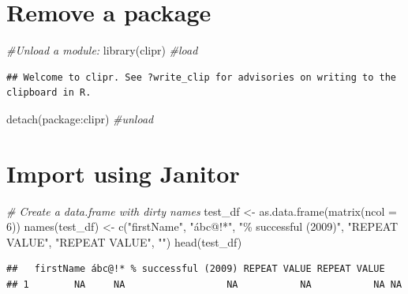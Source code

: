 \documentclass[
]{book}
\newenvironment{Shaded}{\begin{snugshade}}{\end{snugshade}}
\newcommand{\AttributeTok}[1]{\textcolor[rgb]{0.77,0.63,0.00}{#1}}
\newcommand{\CommentTok}[1]{\textcolor[rgb]{0.56,0.35,0.01}{\textit{#1}}}
\newcommand{\DecValTok}[1]{\textcolor[rgb]{0.00,0.00,0.81}{#1}}
\newcommand{\FunctionTok}[1]{\textcolor[rgb]{0.00,0.00,0.00}{#1}}
\newcommand{\NormalTok}[1]{#1}
\newcommand{\OtherTok}[1]{\textcolor[rgb]{0.56,0.35,0.01}{#1}}
\newcommand{\SpecialCharTok}[1]{\textcolor[rgb]{0.00,0.00,0.00}{#1}}
\newcommand{\StringTok}[1]{\textcolor[rgb]{0.31,0.60,0.02}{#1}}
\begin{document}
\hypertarget{remove-a-package}{%
\section{Remove a package}\label{remove-a-package}}

\begin{Shaded}
\begin{Highlighting}[]
\CommentTok{\#Unload a module: }
\FunctionTok{library}\NormalTok{(clipr) }\CommentTok{\#load}
\end{Highlighting}
\end{Shaded}

\begin{verbatim}
## Welcome to clipr. See ?write_clip for advisories on writing to the clipboard in R.
\end{verbatim}

\begin{Shaded}
\begin{Highlighting}[]
\FunctionTok{detach}\NormalTok{(package}\SpecialCharTok{:}\NormalTok{clipr) }\CommentTok{\#unload}
\end{Highlighting}
\end{Shaded}

\hypertarget{import-using-janitor}{%
\section{Import using Janitor}\label{import-using-janitor}}

\begin{Shaded}
\begin{Highlighting}[]
\CommentTok{\# Create a data.frame with dirty names}
\NormalTok{test\_df }\OtherTok{\textless{}{-}} \FunctionTok{as.data.frame}\NormalTok{(}\FunctionTok{matrix}\NormalTok{(}\AttributeTok{ncol =} \DecValTok{6}\NormalTok{))}
\FunctionTok{names}\NormalTok{(test\_df) }\OtherTok{\textless{}{-}} \FunctionTok{c}\NormalTok{(}\StringTok{"firstName"}\NormalTok{, }\StringTok{"ábc@!*"}\NormalTok{, }\StringTok{"\% successful (2009)"}\NormalTok{,}
                    \StringTok{"REPEAT VALUE"}\NormalTok{, }\StringTok{"REPEAT VALUE"}\NormalTok{, }\StringTok{""}\NormalTok{)}
\FunctionTok{head}\NormalTok{(test\_df)}
\end{Highlighting}
\end{Shaded}

\begin{verbatim}
##   firstName ábc@!* % successful (2009) REPEAT VALUE REPEAT VALUE   
## 1        NA     NA                  NA           NA           NA NA
\end{verbatim}
\end{document}
